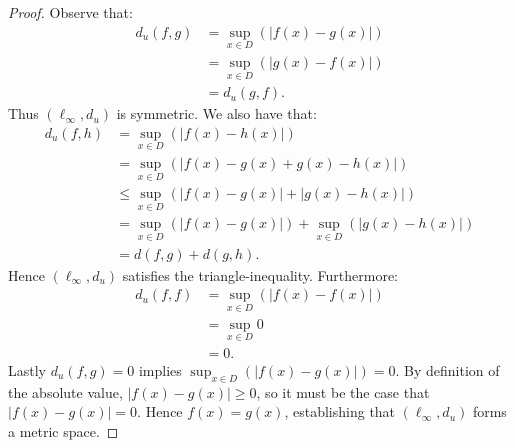 \documentclass[10pt,twoside,openany]{memoir}
\begin{document}
        {\color{red} \begin{proof}
            Observe that:
                \begin{equation*}
                \begin{split}
                    d_u(f,g)
                    & = \sup_{x \in D}\left(\left|f(x) - g(x)\right|\right) \\
                    & = \sup_{x \in D}\left(\left|g(x) - f(x)\right|\right) \\
                    & = d_u(g,f).
                \end{split}
                \end{equation*}
            Thus $(\ell_\infty,d_u)$ is symmetric. We also have that:
                \begin{equation*}
                \begin{split}
                    d_u(f,h)
                    & = \sup_{x \in D}\left(\left|f(x) - h(x)\right|\right) \\
                    & = \sup_{x \in D}\left(\left|f(x) - g(x) + g(x) - h(x)\right|\right)\\
                    & \leq \sup_{x \in D}\left(\left|f(x)-g(x)\right| + \left|g(x) - h(x)\right|\right)\\
                    & = \sup_{x \in D}\left(\left|f(x)-g(x)\right|\right) + \sup_{x \in D}\left(\left|g(x)-h(x)\right|\right)\\
                    & = d(f,g) + d(g,h).
                \end{split}
                \end{equation*}
            Hence $(\ell_\infty,d_u)$ satisfies the triangle-inequality. Furthermore:
                \begin{equation*}
                \begin{split}
                    d_u(f,f)
                    & = \sup_{x \in D}\left(\left|f(x) - f(x)\right|\right) \\
                    & = \sup_{x \in D}0 \\
                    & = 0.
                \end{split}
                \end{equation*}
            Lastly $d_u(f,g)=0$ implies $\sup_{x \in D}\left(\left|f(x) - g(x)\right|\right) = 0$. By definition of the absolute value, $|f(x)-g(x)| \geq 0$, so it must be the case that $|f(x)-g(x)| = 0$. Hence $f(x) = g(x)$, establishing that $(\ell_\infty,d_u)$ forms a metric space.
        \end{proof}}
\end{document}
